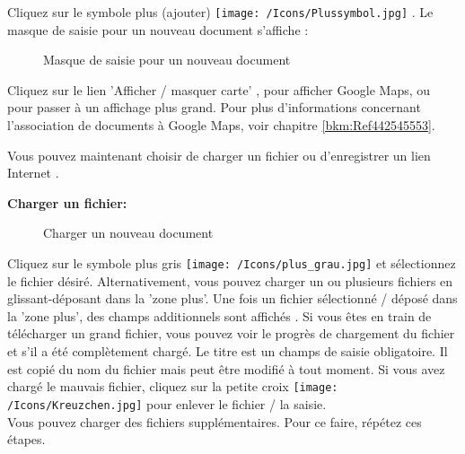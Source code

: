 Cliquez sur le symbole plus (ajouter) \texttt{[image: /Icons/Plussymbol.jpg]} . Le masque de saisie pour un nouveau document s'affiche :

\begin{figure}[H]
\caption{Masque de saisie pour un nouveau document}
\end{figure}

Cliquez sur le lien 'Afficher / masquer carte' , pour afficher Google Maps, ou pour passer à un affichage plus grand. Pour plus d'informations concernant l'association de documents à Google Maps, voir chapitre \ref{bkm:Ref442545553}. \newline

Vous pouvez maintenant choisir de charger un fichier  ou d'enregistrer un lien Internet .

\vspace{\baselineskip}

\textbf{Charger un fichier:} 
\begin{figure}[H]
\caption{Charger un nouveau document}
\end{figure}

Cliquez sur le symbole plus gris \texttt{[image: /Icons/plus\_grau.jpg]}  et sélectionnez le fichier désiré. Alternativement, vous pouvez charger un ou plusieurs fichiers en glissant-déposant dans la 'zone plus'. Une fois un fichier sélectionné / déposé dans la 'zone plus', des champs additionnels sont affichés . Si vous êtes en train de télécharger un grand fichier, vous pouvez voir le progrès de chargement du fichier  et s'il a été complètement chargé. Le titre est un champs de saisie obligatoire. Il est copié du nom du fichier  mais peut être modifié à tout moment. Si vous avez chargé le mauvais fichier, cliquez sur la petite croix \texttt{[image: /Icons/Kreuzchen.jpg]}  pour enlever le fichier / la saisie. \\
Vous pouvez charger des fichiers supplémentaires. Pour ce faire, répétez ces étapes. 

